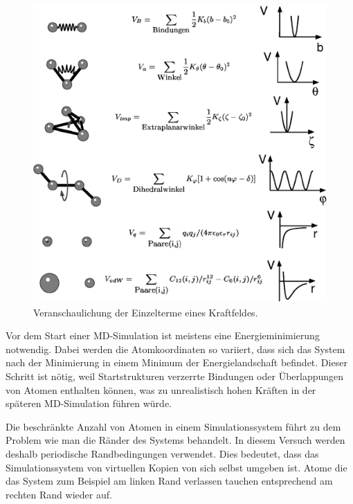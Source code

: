 \documentclass[a4paper,12pt]{article}
\begin{document}
\begin{figure}[htb]
    \centering
    \includegraphics{kraftfeld.png}
    \caption{Veranschaulichung der Einzelterme eines Kraftfeldes.}
    \label{fig:forcefield}
\end{figure}

Vor dem Start einer MD-Simulation ist meistens eine
Energieminimierung notwendig. Dabei werden die Atomkoordinaten
so variiert, dass sich das System nach der Minimierung in einem
Minimum der Energielandschaft befindet. Dieser Schritt ist nötig, weil
Startstrukturen verzerrte Bindungen oder Überlappungen von Atomen enthalten
können, was zu unrealistisch hohen Kräften in der späteren MD-Simulation
führen würde.

Die beschränkte Anzahl von Atomen in einem Simulationssystem führt
zu dem Problem wie man die Ränder des Systems behandelt. In diesem
Versuch werden deshalb periodische Randbedingungen verwendet. Dies
bedeutet, dass das Simulationssystem von virtuellen Kopien von sich selbst
umgeben ist. Atome die das System zum Beispiel am linken Rand
verlassen tauchen entsprechend am rechten Rand wieder auf.

\pagebreak
\end{document}
